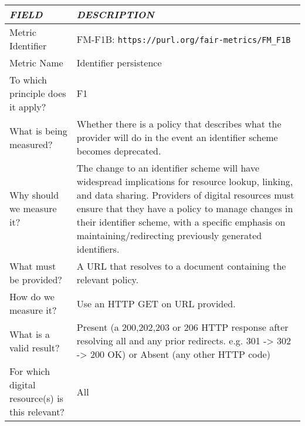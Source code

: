 \documentclass[english]{article}
\begin{document}
\centering

\begin{tabular}{|p{5cm}|p{9cm}|}
\hline
\emph{FIELD} & \emph{DESCRIPTION} \\
\hline
Metric Identifier &   FM-F1B: \verb"https://purl.org/fair-metrics/FM_F1B"
 \\


\hline
Metric Name &   
Identifier persistence
 \\



\hline
To which principle does it apply? &   F1\\



\hline
What is being measured? & Whether there is a policy that describes what the provider will do in the event an identifier scheme becomes deprecated.\\



\hline
Why should we measure it? & 

The change to an identifier scheme will have widespread implications for resource lookup, linking, and data sharing. Providers of digital resources must ensure that they have a policy to manage changes in their identifier scheme, with a specific emphasis on maintaining/redirecting previously generated identifiers.
  
\\



\hline
What must be provided? &  
A URL that resolves to a document containing the relevant policy.
 \\



\hline
How do we measure it? &  
Use an HTTP GET on URL provided. \newline
\\



\hline
What is a valid result? &  
Present (a 200,202,203 or 206 HTTP response after resolving all and any prior redirects. e.g. 301 -> 302 -> 200 OK) or Absent (any other HTTP code)
\\



\hline
For which digital resource(s) is this relevant? &  All\\




\end{tabular}
\end{document}
